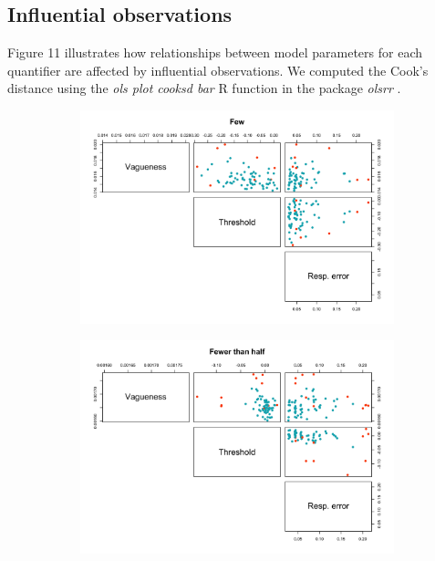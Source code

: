 \documentclass{article}
\begin{document}
\subsection{Influential observations}\label{appendix:ch3.4}
Figure 11 illustrates how relationships between model parameters for each quantifier are affected by influential observations. We computed the Cook’s distance using the \textit{ols plot cooksd bar} R function in the package \textit{olsrr} \cite{Hebbali2020Tools0.5.3}.

\begin{figure} [H]
   \begin{minipage}[b]{0.49\textwidth}
    
    \begin{subfigure}[b]{\linewidth}
     \includegraphics[width=\linewidth]{Figure2.11a.png}
     \caption{\label{fig:fig2.11a}}
    \end{subfigure}
    
    \vspace*{4mm}
    \begin{subfigure}[b]{\linewidth}
     \includegraphics[width=\linewidth]{Figure2.11b.png}
     \caption{\label{fig:fig2.11b}}
    \end{subfigure}
    

\end{minipage}
\end{figure}
\end{document}
